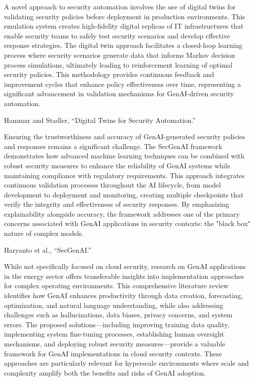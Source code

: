A novel approach to security automation involves the use of digital twins for validating security policies before deployment in production environments. This emulation system creates high-fidelity digital replicas of IT infrastructures that enable security teams to safely test security scenarios and develop effective response strategies.
The digital twin approach facilitates a closed-loop learning process where security scenarios generate data that informs Markov decision process simulations, ultimately leading to reinforcement learning of optimal security policies. This methodology provides continuous feedback and improvement cycles that enhance policy effectiveness over time, representing a significant advancement in validation mechanisms for GenAI-driven security automation.

Hammar and Stadler, “Digital Twins for Security Automation.”

Ensuring the trustworthiness and accuracy of GenAI-generated security policies and responses remains a significant challenge. The SecGenAI framework demonstrates how advanced machine learning techniques can be combined with robust security measures to enhance the reliability of GenAI systems while maintaining compliance with regulatory requirements.
This approach integrates continuous validation processes throughout the AI lifecycle, from model development to deployment and monitoring, creating multiple checkpoints that verify the integrity and effectiveness of security responses. By emphasizing explainability alongside accuracy, the framework addresses one of the primary concerns associated with GenAI applications in security contexts: the "black box" nature of complex models.

Haryanto et al., “SecGenAI.”

While not specifically focused on cloud security, research on GenAI applications in the energy sector offers transferable insights into implementation approaches for complex operating environments. This comprehensive literature review identifies how GenAI enhances productivity through data creation, forecasting, optimization, and natural language understanding, while also addressing challenges such as hallucinations, data biases, privacy concerns, and system errors.
The proposed solutions—including improving training data quality, implementing system fine-tuning processes, establishing human oversight mechanisms, and deploying robust security measures—provide a valuable framework for GenAI implementations in cloud security contexts. These approaches are particularly relevant for hyperscale environments where scale and complexity amplify both the benefits and risks of GenAI adoption.


